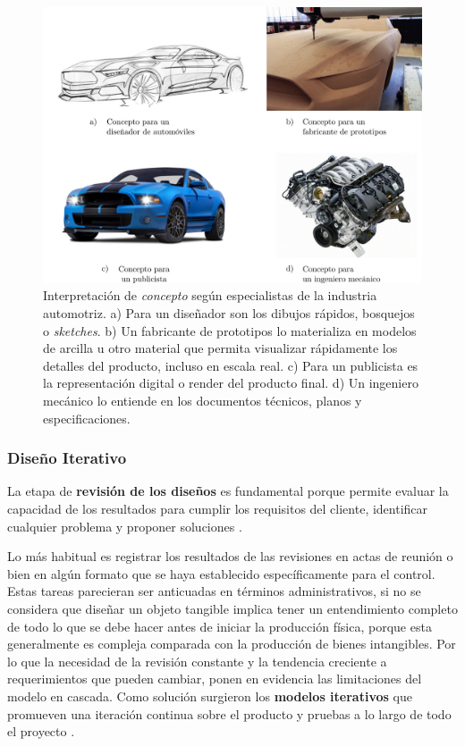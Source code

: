 \begin{figure}[ht]
\centering
\includegraphics[width=14cm]{Img/INTRO/intro-codesign1.jpg}
\caption{\footnotesize{Interpretación de  \textit{concepto} según especialistas de la industria automotriz. a) Para un diseñador son los dibujos rápidos, bosquejos o \textit{sketches}. b) Un fabricante de prototipos lo materializa en modelos de arcilla u otro material que permita visualizar rápidamente los detalles del producto, incluso en escala real. c) Para un publicista es la representación digital o render del producto final. d) Un ingeniero mecánico lo entiende en los documentos técnicos, planos y especificaciones. \citep{Kleinsmann2006} }}
\label{fig:concept}
\end{figure}

\subsubsection{Diseño Iterativo}
\label{iterativo}

La etapa de \textbf{revisión de los diseños} es fundamental porque permite evaluar la capacidad de los resultados para cumplir los requisitos del cliente, identificar cualquier problema y proponer soluciones \citep{Pereiro2005}. 

Lo más habitual es registrar los resultados de las revisiones en actas de reunión o bien en algún formato que se haya establecido  específicamente para el control. 
Estas tareas parecieran ser anticuadas en términos administrativos, si no se considera que diseñar un objeto tangible implica tener un entendimiento completo de todo lo que se debe hacer antes de iniciar la producción física, porque esta generalmente es compleja comparada con la producción de bienes intangibles. Por lo que la necesidad de la revisión constante y la tendencia creciente a requerimientos que pueden cambiar, ponen en evidencia las limitaciones del modelo en cascada. Como solución surgieron los \textbf{modelos iterativos} que promueven una iteración continua sobre el producto y pruebas a lo largo de todo el proyecto  \citep{laurel2003design}.

